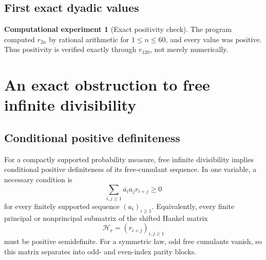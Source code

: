 \documentclass[11pt]{article}
\theoremstyle{definition}
\newtheorem{experiment}[theorem]{Computational experiment}
\begin{document}
\subsection{First exact dyadic values}
\begin{table}[ht]
\centering
\caption{First even moments, free cumulants, and Boolean cumulants of the dyadic up-law.}
\label{tab:firstcumulants}
\end{table}

\begin{experiment}[Exact positivity check]\label{exp:freepositive}
The program computed \(r_{2n}\) by rational arithmetic for \(1\le n\le60\), and every value was positive. Thus positivity is verified exactly through \(r_{120}\), not merely numerically.
\end{experiment}

\section{An exact obstruction to free infinite divisibility}
\subsection{Conditional positive definiteness}
For a compactly supported probability measure, free infinite divisibility implies conditional positive definiteness of its free-cumulant sequence. In one variable, a necessary condition is
\begin{equation}\label{eq:CPD}
\sum_{i,j\ge1}\overline{a_i}a_jr_{i+j}\ge0
\end{equation}
for every finitely supported sequence \((a_i)_{i\ge1}\). Equivalently, every finite principal or nonprincipal submatrix of the shifted Hankel matrix
\[
\mathcal H_r=(r_{i+j})_{i,j\ge1}
\]
must be positive semidefinite. For a symmetric law, odd free cumulants vanish, so this matrix separates into odd- and even-index parity blocks.
\end{document}
